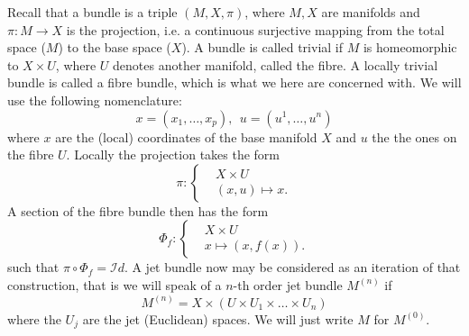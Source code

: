 \documentclass[12pt,a4paper]{article}
\begin{document}
Recall that a bundle is a triple $(M,X,\pi)$, where $M,X$ are manifolds
and $\pi:M\rightarrow X$ is the projection, i.e. a continuous surjective
mapping from the total space ($M$) to the base space ($X$). A bundle is 
called trivial if $M$ is homeomorphic to $X\times U$, where
$U$ denotes another manifold, called the fibre. A locally trivial bundle
is called a fibre bundle, which is what we here are concerned with.
We will use the following nomenclature: 
\begin{displaymath}
   x=(x_1,\ldots,x_p), \ \ u=(u^1,\ldots,u^n)
\end{displaymath}
where $x$ are the (local) coordinates of the base manifold $X$ and $u$
the the ones on the fibre $U$. Locally the projection takes the form
\begin{displaymath}
 \pi:\begin{cases} 
      & X\times U \\
      & (x,u) \mapsto x.
   \end{cases}
\end{displaymath}
A section of the fibre bundle then has the form
\begin{displaymath}
 \Phi_f:\begin{cases} 
      & X\times U \\
      & x \mapsto (x,f(x)).
\end{cases}
\end{displaymath}
such that $\pi\circ \Phi_f = \mathcal{I}d$.
A jet bundle now may be considered as an iteration of that construction,
that is we will speak of a $n$-th order jet bundle $M^{(n)}$ if
\begin{displaymath}
 M^{(n)} = X \times \left( U\times U_1\times\ldots\times U_n  \right)
\end{displaymath}  
where the $U_j$ are the jet (Euclidean) spaces. We will just write $M$
for $M^{(0)}$.
%
\end{document}
